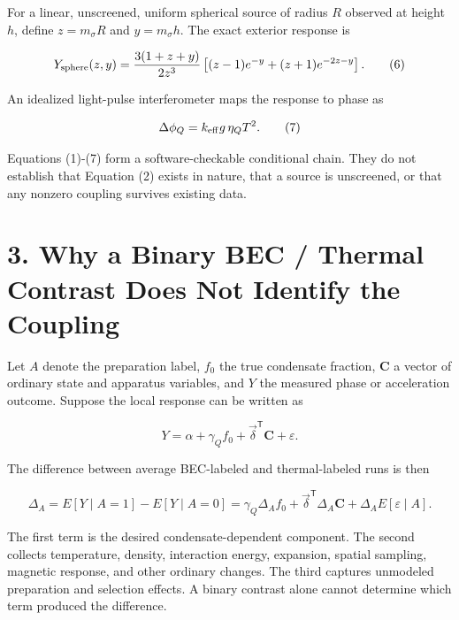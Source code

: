 \documentclass[
  american,
  11pt,
  letterpaper,
]{article}
\begin{document}
For a linear, unscreened, uniform spherical source of radius \(R\) observed at height \(h\), define \(z=m_\sigma R\) and \(y=m_\sigma h\). The exact exterior response is

\begin{equation}
Y_{\rm sphere}(z,y)
=\frac{3(1+z+y)}{2z^3}
\left[(z-1)e^{-y}+(z+1)e^{-2z-y}\right].
\tag{6}
\end{equation}

An idealized light-pulse interferometer maps the response to phase as

\begin{equation}
\Delta\phi_Q=k_{\rm eff}g\,\eta_QT^2 .
\tag{7}
\end{equation}

Equations (1)-(7) form a software-checkable conditional chain. They do not establish that Equation (2) exists in nature, that a source is unscreened, or that any nonzero coupling survives existing data.

\section{3. Why a Binary BEC / Thermal Contrast Does Not Identify the Coupling}\label{why-a-binary-bec-thermal-contrast-does-not-identify-the-coupling}

Let \(A\) denote the preparation label, \(f_0\) the true condensate fraction, \(\mathbf C\) a vector of ordinary state and apparatus variables, and \(Y\) the measured phase or acceleration outcome. Suppose the local response can be written as

\begin{equation}
Y=\alpha+\gamma_Q f_0+\vec{\delta}^{\mathsf T}\mathbf C+\varepsilon .
\tag{8}
\end{equation}

The difference between average BEC-labeled and thermal-labeled runs is then

\begin{equation}
\Delta_A
=E[Y\mid A=1]-E[Y\mid A=0]
=\gamma_Q\Delta_A f_0
+\vec{\delta}^{\mathsf T}\Delta_A\mathbf C
+\Delta_AE[\varepsilon\mid A] .
\tag{9}
\end{equation}

The first term is the desired condensate-dependent component. The second collects temperature, density, interaction energy, expansion, spatial sampling, magnetic response, and other ordinary changes. The third captures unmodeled preparation and selection effects. A binary contrast alone cannot determine which term produced the difference.
\end{document}

